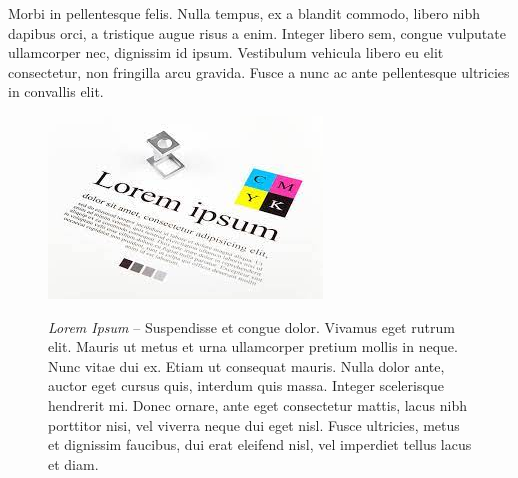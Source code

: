 \documentclass{beamer}
\begin{document}
\begin{frame}

Morbi in pellentesque felis. Nulla tempus, ex a blandit commodo, libero nibh dapibus orci, a tristique augue risus a enim. Integer 
libero sem, congue vulputate ullamcorper nec, dignissim id ipsum. Vestibulum vehicula libero eu elit consectetur, non fringilla arcu 
gravida. Fusce a nunc ac ante pellentesque ultricies in convallis elit. 
\end{frame}
\begin{frame}

\begin{figure}[htp]
\begin{minipage}{0.33\textwidth}
\centering
\includegraphics[width=\textwidth]{foto4.jpeg}
\end{minipage}
\begin{minipage}{0.66\textwidth}
\centering
\textit{Lorem Ipsum} – Suspendisse et congue dolor. Vivamus eget rutrum elit. Mauris ut metus et urna ullamcorper pretium mollis in 
neque. Nunc vitae dui ex. Etiam ut consequat mauris. Nulla dolor ante, auctor eget cursus quis, interdum quis massa. Integer scelerisque 
hendrerit mi. Donec ornare, ante eget consectetur mattis, lacus nibh porttitor nisi, vel viverra neque dui eget nisl. Fusce ultricies, 
metus et dignissim faucibus, dui erat eleifend nisl, vel imperdiet tellus lacus et diam.
\end{minipage}
\end{figure}

\end{frame}


\end{document}
